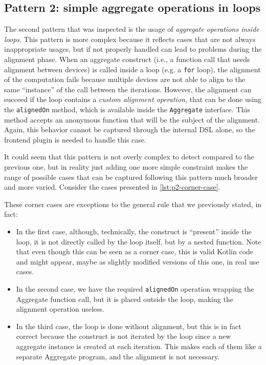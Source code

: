 \documentclass[12pt,a4paper,openright,twoside]{book}
\begin{document}
\subsection{Pattern 2: simple aggregate operations in loops} \label{sec:p2}

The second pattern that was inspected is the usage of \emph{aggregate operations
inside loops}. This pattern is more complex because it reflects cases that are
not always inappropriate usages, but if not properly handled can lead to
problems during the alignment phase. 
%
When an aggregate construct (i.e., a function call that needs alignment between
devices) is called inside a loop (e.g. a \lstinline{for} loop), the alignment of
the computation fails because multiple devices are not able to align to the same
``instance'' of the call between the iterations. 
%
However, the alignment can succeed if the loop contains a \emph{custom alignment
operation}, that can be done using the \lstinline{alignedOn} method, which is
available inside the \lstinline{Aggregate} interface. This method accepts an
anonymous function that will be the subject of the alignment. 
%
Again, this behavior cannot be captured through the internal DSL alone, so the
frontend plugin is needed to handle this case. 

It could seem that this pattern is not overly complex to detect compared to the
previous one, but in reality just adding one more simple constraint makes the
range of possible cases that can be captured following this pattern much broader
and more varied. Consider the cases presented in \cref{lst:p2-corner-case}. 

These corner cases are exceptions to the general rule that we previously stated,
in fact:
\begin{itemize}
  \item In the first case, although, technically, the construct is ``present''
  inside the loop, it is not directly called by the loop itself, but by a nested
  function. Note that even though this can be seen as a corner case, this is
  valid Kotlin code and might appear, maybe as slightly modified versions of
  this one, in real use cases.
  \item In the second case, we have the required \lstinline{alignedOn} operation
  wrapping the Aggregate function call, but it is placed outside the loop,
  making the alignment operation useless.
  \item In the third case, the loop is done without alignment, but this is in
  fact correct because the construct is not iterated by the loop since a new
  aggregate instance is created at each iteration. This makes each of them
  like a separate Aggregate program, and the alignment is not necessary.
\end{itemize}
\end{document}
